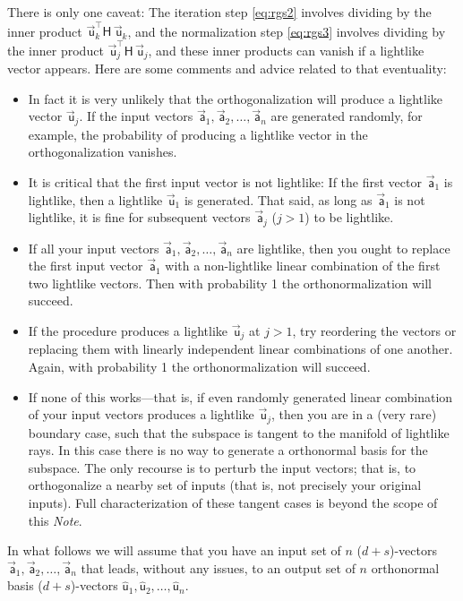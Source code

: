 \documentclass{article}
\newcommand{\metric}{\mathsf{H}}
\newcommand\upvec[1]{\!\vec{\,\mathrm{#1}}}
\newcommand{\Lvec}[1]{\upvec{\mathsf{#1}}} %
\newcommand{\Lhat}[1]{\hat{\mathsf{#1}}} %
\newcommand{\plus}{\!+\!} %
\newcommand{\documentname}{\textsl{Note}}
\begin{document}
There is only one caveat:
The iteration step \eqref{eq:rgs2} involves dividing by the inner product $\Lvec{u}_k^\top\metric\,\Lvec{u}_k$, and the normalization step \eqref{eq:rgs3} involves dividing by the inner product $\Lvec{u}_j^\top\metric\,\Lvec{u}_j$, and these inner products can vanish if a lightlike vector appears.
Here are some comments and advice related to that eventuality:
\begin{itemize}
\item In fact it is very unlikely that the orthogonalization will produce a lightlike vector $\Lvec{u}_j$.
If the input vectors $\Lvec{a}_1,\Lvec{a}_2,\ldots,\Lvec{a}_n$ are generated randomly, for example, the probability of producing a lightlike vector in the orthogonalization vanishes.
\item It is critical that the first input vector is not lightlike: If the first vector $\Lvec{a}_1$ is lightlike, then a lightlike $\Lvec{u}_1$ is generated.
That said, as long as $\Lvec{a}_1$ is not lightlike, it is fine for subsequent vectors $\Lvec{a}_j$ ($j>1$) to be lightlike.
\item If all your input vectors $\Lvec{a}_1,\Lvec{a}_2,\ldots,\Lvec{a}_n$ are lightlike, then you ought to replace the first input vector $\Lvec{a}_1$ with a non-lightlike linear combination of the first two lightlike vectors.
Then with probability 1 the orthonormalization will succeed.
\item If the procedure produces a lightlike $\Lvec{u}_j$ at $j>1$, try reordering the vectors or replacing them with linearly independent linear combinations of one another.
Again, with probability 1 the orthonormalization will succeed.
\item If none of this works---that is, if even randomly generated linear combination of your input vectors produces a lightlike $\Lvec{u}_j$, then you are in a (very rare) boundary case, such that the subspace is tangent to the manifold of lightlike rays.
In this case there is no way to generate a orthonormal basis for the subspace.
The only recourse is to perturb the input vectors; that is, to orthogonalize a nearby set of inputs (that is, not precisely your original inputs).
Full characterization of these tangent cases is beyond the scope of this \documentname.
\end{itemize}
In what follows we will assume that you have an input set of $n$ ($d\plus s$)-vectors $\Lvec{a}_1,\Lvec{a}_2,\ldots,\Lvec{a}_n$ that leads, without any issues, to an output set of $n$ orthonormal basis ($d\plus s$)-vectors $\Lhat{u}_1,\Lhat{u}_2,\ldots,\Lhat{u}_n$.
\end{document}
